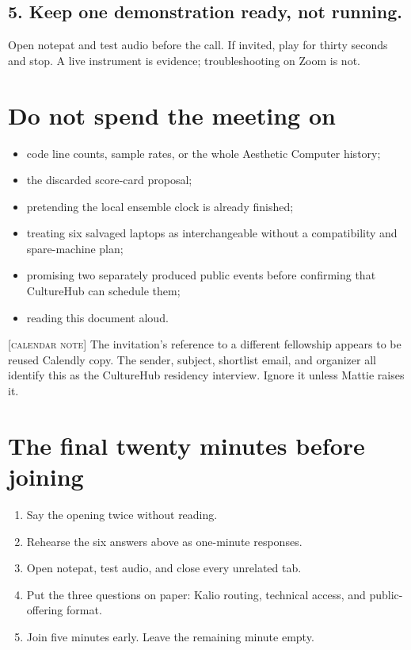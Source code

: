 \documentclass[11pt,letterpaper]{article}
\newcommand{\soft}[1]{{\color{acwarn}\footnotesize\textsc{[#1]}}}
\begin{document}
\subsection{5. Keep one demonstration ready, not running.}
Open notepat and test audio before the call. If invited, play for thirty seconds
and stop. A live instrument is evidence; troubleshooting on Zoom is not.

\section{Do not spend the meeting on}

\begin{itemize}
  \item code line counts, sample rates, or the whole Aesthetic Computer history;
  \item the discarded score-card proposal;
  \item pretending the local ensemble clock is already finished;
  \item treating six salvaged laptops as interchangeable without a compatibility
  and spare-machine plan;
  \item promising two separately produced public events before confirming that
  CultureHub can schedule them;
  \item reading this document aloud.
\end{itemize}

\soft{calendar note} The invitation's reference to a different fellowship
appears to be reused Calendly copy. The sender, subject, shortlist email, and
organizer all identify this as the CultureHub residency interview. Ignore it
unless Mattie raises it.

\section{The final twenty minutes before joining}

\begin{enumerate}
  \item Say the opening twice without reading.
  \item Rehearse the six answers above as one-minute responses.
  \item Open notepat, test audio, and close every unrelated tab.
  \item Put the three questions on paper: Kalio routing, technical access, and
  public-offering format.
  \item Join five minutes early. Leave the remaining minute empty.
\end{enumerate}
\end{document}
